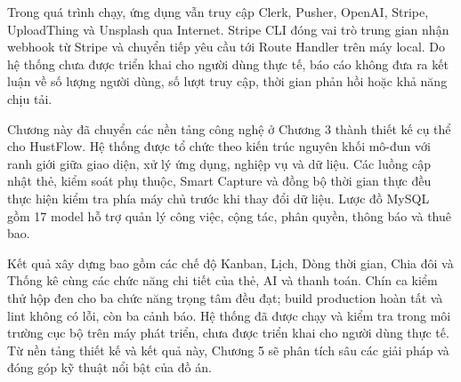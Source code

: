\documentclass[../DoAn.tex]{subfiles}
\begin{document}
Trong quá trình chạy, ứng dụng vẫn truy cập Clerk, Pusher, OpenAI, Stripe, UploadThing và Unsplash qua Internet. Stripe CLI đóng vai trò trung gian nhận webhook từ Stripe và chuyển tiếp yêu cầu tới Route Handler trên máy local. Do hệ thống chưa được triển khai cho người dùng thực tế, báo cáo không đưa ra kết luận về số lượng người dùng, số lượt truy cập, thời gian phản hồi hoặc khả năng chịu tải.


Chương này đã chuyển các nền tảng công nghệ ở Chương 3 thành thiết kế cụ thể cho HustFlow. Hệ thống được tổ chức theo kiến trúc nguyên khối mô-đun với ranh giới giữa giao diện, xử lý ứng dụng, nghiệp vụ và dữ liệu. Các luồng cập nhật thẻ, kiểm soát phụ thuộc, Smart Capture và đồng bộ thời gian thực đều thực hiện kiểm tra phía máy chủ trước khi thay đổi dữ liệu. Lược đồ MySQL gồm 17 model hỗ trợ quản lý công việc, cộng tác, phân quyền, thông báo và thuê bao.

Kết quả xây dựng bao gồm các chế độ Kanban, Lịch, Dòng thời gian, Chia đôi và Thống kê cùng các chức năng chi tiết của thẻ, AI và thanh toán. Chín ca kiểm thử hộp đen cho ba chức năng trọng tâm đều đạt; build production hoàn tất và lint không có lỗi, còn ba cảnh báo. Hệ thống đã được chạy và kiểm tra trong môi trường cục bộ trên máy phát triển, chưa được triển khai cho người dùng thực tế. Từ nền tảng thiết kế và kết quả này, Chương 5 sẽ phân tích sâu các giải pháp và đóng góp kỹ thuật nổi bật của đồ án.
\end{document}
